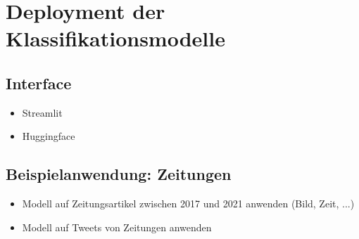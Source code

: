 
\chapter{Deployment der Klassifikationsmodelle} \label{ch:crispDm_3}

\section{Interface}

\begin{itemize}
    \item Streamlit
    \item Huggingface
\end{itemize}

\section{Beispielanwendung: Zeitungen}

\begin{itemize}
    \item Modell auf Zeitungsartikel zwischen 2017 und 2021 anwenden (Bild, Zeit, ...)
    \item Modell auf Tweets von Zeitungen anwenden
\end{itemize}
    